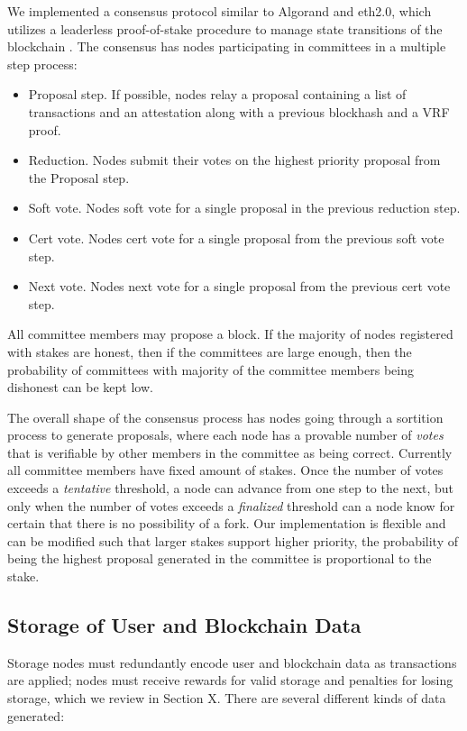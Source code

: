 \documentclass[journal]{IEEEtran}
\begin{document}
We implemented a consensus protocol similar to Algorand and eth2.0, which utilizes a leaderless proof-of-stake procedure to manage state transitions of the blockchain \cite{cryptoeprint:2018:377}. The consensus has nodes participating in committees in a multiple step process:
\begin{itemize}
    \item Proposal step.  If possible, nodes relay a proposal containing a list of transactions and an attestation along with a previous blockhash and a VRF proof.
    \item Reduction.  Nodes submit their votes on the highest priority proposal from the Proposal step.
    \item Soft vote.  Nodes soft vote for a single proposal in the previous reduction step.
    \item Cert vote.  Nodes cert vote for a single proposal from the previous soft vote step.
    \item Next vote.  Nodes next vote for a single proposal from the previous cert vote step.
\end{itemize}
All committee members may propose a block.  If the majority of nodes registered with stakes are honest, then if the committees are large enough, then the probability of  committees with majority of the committee members being dishonest can be kept low.

The overall shape of the consensus process has nodes going through a sortition process to generate proposals, where each node has a provable number of {\em votes} that is verifiable by other members in the committee as being correct.  Currently all committee members have fixed amount of stakes. Once the number of votes exceeds a {\em tentative} threshold, a node can advance from one step to the next, but only when the number of votes exceeds a {\em finalized} threshold can a node know for certain that there is no possibility of a fork. Our implementation is flexible and can be modified such that larger stakes support higher priority, the probability of being the highest proposal generated in the committee is proportional to the stake.


\subsection{Storage of User and Blockchain Data}
\label{sec:storage}

Storage nodes must redundantly encode user and blockchain data as transactions are applied; nodes must receive rewards for valid storage and penalties for losing storage, which we review in Section X.  There are several different kinds of data generated:
\end{document}
